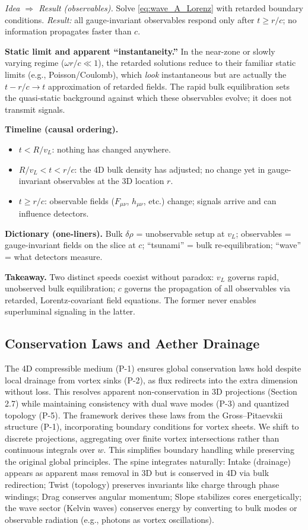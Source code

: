\noindent\emph{Idea $\Rightarrow$ Result (observables).} Solve \eqref{eq:wave_A_Lorenz} with retarded boundary conditions. \emph{Result:} all gauge-invariant observables respond only after $t\ge r/c$; no information propagates faster than $c$.

\medskip
\noindent\textbf{Static limit and apparent ``instantaneity.''} In the near-zone or slowly varying regime ($\omega r/c\!\ll\!1$), the retarded solutions reduce to their familiar static limits (e.g., Poisson/Coulomb), which \emph{look} instantaneous but are actually the $t{-}r/c\!\to\!t$ approximation of retarded fields. The rapid bulk equilibration sets the quasi-static background against which these observables evolve; it does not transmit signals.

\medskip
\noindent\textbf{Timeline (causal ordering).}
\begin{itemize}
\item $t< R/v_L$: nothing has changed anywhere.
\item $R/v_L < t < r/c$: the 4D bulk density has adjusted; no change yet in gauge-invariant observables at the 3D location $r$.
\item $t\ge r/c$: observable fields ($F_{\mu\nu}$, $h_{\mu\nu}$, etc.) change; signals arrive and can influence detectors.
\end{itemize}

\medskip
\noindent\textbf{Dictionary (one-liners).} Bulk $\delta\rho$ = unobservable setup at $v_L$; observables = gauge-invariant fields on the slice at $c$; ``tsunami'' = bulk re-equilibration; ``wave'' = what detectors measure.

\medskip
\noindent\textbf{Takeaway.} Two distinct speeds coexist without paradox: $v_L$ governs rapid, unobserved bulk equilibration; $c$ governs the propagation of all observables via retarded, Lorentz-covariant field equations. The former never enables superluminal signaling in the latter.

\subsection{Conservation Laws and Aether Drainage}

The 4D compressible medium (P-1) ensures global conservation laws hold despite local drainage from vortex sinks (P-2), as flux redirects into the extra dimension without loss. This resolves apparent non-conservation in 3D projections (Section 2.7) while maintaining consistency with dual wave modes (P-3) and quantized topology (P-5). The framework derives these laws from the Gross–Pitaevskii structure (P-1), incorporating boundary conditions for vortex sheets. We shift to discrete projections, aggregating over finite vortex intersections rather than continuous integrals over $w$. This simplifies boundary handling while preserving the original global principles. The spine integrates naturally: Intake (drainage) appears as apparent mass removal in 3D but is conserved in 4D via bulk redirection; Twist (topology) preserves invariants like charge through phase windings; Drag conserves angular momentum; Slope stabilizes cores energetically; the wave sector (Kelvin waves) conserves energy by converting to bulk modes or observable radiation (e.g., photons as vortex oscillations).

